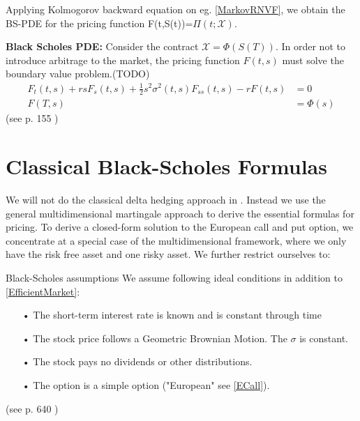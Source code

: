 Applying Kolmogorov backward equation on eg. \ref{MarkovRNVF}, we obtain the BS-PDE for the pricing function F(t,S(t))=$\Pi(t; \mathcal{X})$.

\begin{theorem}\label{BSPDEMultiDim}
\textbf{Black Scholes PDE: } Consider the contract $\mathcal{X}=\Phi(S(T))$. In order not to introduce arbitrage to the market, the pricing function $F(t,s)$ must solve the boundary value problem.(TODO)
\begin{equation}
\begin{split}
F_t(t,s)+rsF_s(t,s)+\frac{1}{2} s^2 \sigma^2(t,s)F_{ss}(t,s) -rF(t,s)&=0\\
F(T,s)&=\Phi(s)
\end{split}
\end{equation}
(see p. 155 \parencite{finKont})
\end{theorem}


\section{Classical Black-Scholes Formulas}\label{classicBS}
We will not do the classical delta hedging approach in \parencite{B-S-Paper}. Instead we use the general multidimensional martingale approach to derive the essential formulas for pricing. 
To derive a closed-form solution to the European call and put option, we concentrate at a special case of the multidimensional framework, where we only have the risk free asset and one risky asset. 
We further restrict ourselves to:\\
\theoremstyle{assumption}
\begin{assumption}{Black-Scholes assumptions}\label{BS-Assumption}
We assume following ideal conditions in addition to \eqref{EfficientMarket}:
\begin{enumerate}
\item[•] The short-term interest rate is known and is constant through time 
\item[•] The stock price follows a Geometric Brownian Motion. The $\sigma$ is constant.\item[•] The stock pays no dividends or other distributions.
\item[•] The option is a simple option ("European" see \eqref{ECall}).
\end{enumerate}
(see p. 640 \parencite{B-S-Paper})
\end{assumption}

